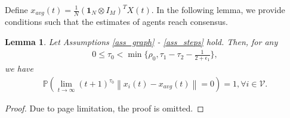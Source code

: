 \documentclass[10pt,journal,final]{IEEEtran}
\newcommand{\norm}[1]{\left\lVert#1\right\rVert}
\theoremstyle{plain}
\newtheorem{lemma}{\textbf{Lemma}}[section]
\theoremstyle{definition}
\theoremstyle{remark}
\begin{document}
Define   $x_{avg}(t)=\frac{1}{N}(\textbf{1}_N\otimes  I_M)^TX(t)$.
In the following lemma, we provide conditions such that the estimates of agents reach consensus. 
\begin{lemma}\label{lem_consensus}
Let Assumptions \ref{ass_graph} - \ref{ass_steps} hold. Then,
 for any 	\begin{align*}
	0\leq\tau_0<\min\{\rho_0,\tau_1-\tau_2-\frac{1}{2+\epsilon_1}\}, 
	\end{align*}
	we have
	\begin{align*}
	\mathbb{P}\left(\lim\limits_{t\rightarrow\infty}(t+1)^{\tau_0}\norm{x_i(t)-x_{avg}(t)}=0\right)=1, \forall i\in\mathcal{V}.
	\end{align*}
\end{lemma}
\begin{proof}
		Due to page limitation, the proof is omitted.

\end{proof}
\end{document}

